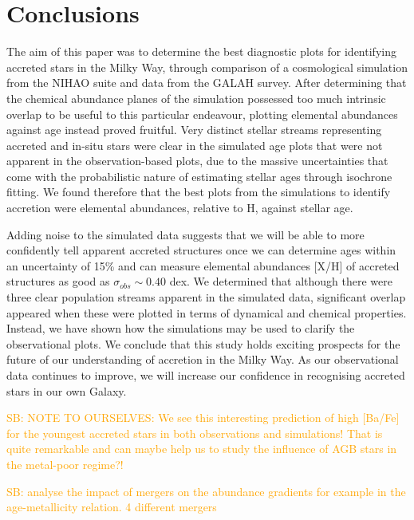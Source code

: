\documentclass[fleqn,usenatbib]{mnras}
\newcommand{\SB}[1]{{\textcolor{orange}{SB: #1}}}
\begin{document}

\section{Conclusions}
\label{sec:conc}

The aim of this paper was to determine the best diagnostic plots for identifying accreted stars in the Milky Way, through comparison of a cosmological simulation from the NIHAO suite and data from the GALAH survey. After determining that the chemical abundance planes of the simulation possessed too much intrinsic overlap to be useful to this particular endeavour, plotting elemental abundances against age instead proved fruitful. Very distinct stellar streams representing accreted and in-situ stars were clear in the simulated age plots that were not apparent in the observation-based plots, due to the massive uncertainties that come with the probabilistic nature of estimating stellar ages through isochrone fitting. We found therefore that the best plots from the simulations to identify accretion were elemental abundances, relative to H, against stellar age. \par 
Adding noise to the simulated data suggests that we will be able to more confidently tell apparent accreted structures once we can determine ages within an uncertainty of 15\% and can measure elemental abundances [X/H] of accreted structures as good as $\sigma_{obs}\sim0.40$ dex. We determined that although there were three clear population streams apparent in the simulated data, significant overlap appeared when these were plotted in terms of dynamical and chemical properties. Instead, we have shown how the simulations may be used to clarify the observational plots. We conclude that this study holds exciting prospects for the future of our understanding of accretion in the Milky Way. As our observational data continues to improve, we will increase our confidence in recognising accreted stars in our own Galaxy. 

\SB{NOTE TO OURSELVES: We see this interesting prediction of high [Ba/Fe] for the youngest accreted stars in both observations and simulations! That is quite remarkable and can maybe help us to study the influence of AGB stars in the metal-poor regime?!}

\SB{\citet{Buck2023} analyse the impact of mergers on the abundance gradients for example in the age-metallicity relation. 4 different mergers }
\end{document}
